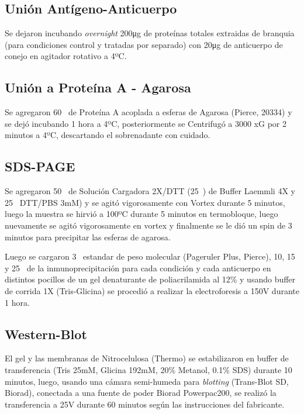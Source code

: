 \documentclass[12pt,a4paper,oneside]{scrbook}
\begin{document}
\subsection{Unión Antígeno-Anticuerpo}

Se dejaron incubando \emph{overnight} 200\si{\micro\gram} de proteínas
totales extraidas de branquia (para condiciones control y tratadas por
separado) con 20\si{\micro\gram} de anticuerpo de conejo en agitador
rotativo a 4ºC.

\subsection{Unión a Proteína A - Agarosa}

Se agregaron 60\si{\micro\litro} de Proteína A acoplada a esferas de
Agarosa (Pierce, 20334) y se dejó incubando 1 hora a 4ºC, posteriormente
se Centrifugó a 3000 xG por 2 minutos a 4ºC, descartando el sobrenadante
con cuidado.

\subsection{SDS-PAGE}

Se agregaron 50\si{\micro\litro} de Solución Cargadora 2X/DTT
(25\si{\micro\litro}) de Buffer Laemmli 4X y 25\si{\micro\litro} DTT/PBS
3mM) y se agitó vigorosamente con Vortex durante 5 minutos, luego la
muestra se hirvió a 100ºC durante 5 minutos en termobloque, luego
nuevamente se agitó vigorosamente en vortex y finalmente se le dió un
spin de 3 minutos para precipitar las esferas de agarosa.

Luego se cargaron 3\si{\micro\litro} estandar de peso molecular
(Pageruler Plus, Pierce), 10, 15 y 25\si{\micro\litro} de la
inmunoprecipitación para cada condición y cada anticuerpo en distintos
pocillos de un gel denaturante de poliacrilamida al 12\% y usando buffer
de corrida 1X (Tris-Glicina) se procedió a realizar la electroforesis a
150V durante 1 hora.

\subsection{Western-Blot}

El gel y las membranas de Nitrocelulosa (Thermo) se estabilizaron en
buffer de transferencia (Tris 25mM, Glicina 192mM, 20\% Metanol, 0.1\%
SDS) durante 10 minutos, luego, usando una cámara semi-humeda para
\emph{blotting} (Trans-Blot SD, Biorad), conectada a una fuente de poder
Biorad Powerpac200, se realizó la transferencia a 25V durante 60 minutos
según las instrucciones del fabricante.
\end{document}
